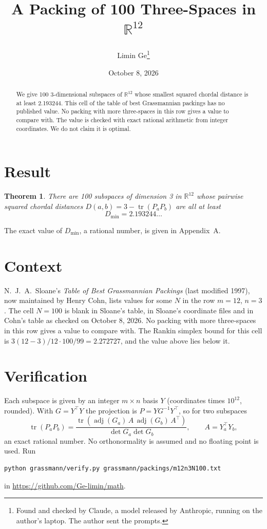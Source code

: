 \documentclass[11pt,a4paper]{article}
\title{A Packing of 100 Three-Spaces in $\mathbb{R}^{12}$}
\author{Limin Ge\thanks{Found and checked by Claude, a model released by Anthropic, running on the author's laptop. The author sent the prompts.}}
\date{October 8, 2026}
\newtheorem*{theorem}{Theorem}
\begin{document}
\maketitle
\begin{abstract}
We give 100 3-dimensional subspaces of $\mathbb{R}^{12}$ whose smallest squared chordal distance is at least 2.193244. This cell of the table of best Grassmannian packings has no published value. No packing with more three-spaces in this row gives a value to compare with. The value is checked with exact rational arithmetic from integer coordinates. We do not claim it is optimal.
\end{abstract}

\section{Result}
\begin{theorem}
There are 100 subspaces of dimension 3 in $\mathbb{R}^{12}$ whose pairwise squared chordal distances $D(a,b) = 3 - \operatorname{tr}(P_aP_b)$ are all at least
\[ D_{\min} = 2.193244\ldots \]
\end{theorem}
The exact value of $D_{\min}$, a rational number, is given in Appendix~A.


\section{Context}
N.~J.~A.~Sloane's \emph{Table of Best Grassmannian Packings} (last modified 1997), now maintained by Henry Cohn, lists values for some $N$ in the row $m=12$, $n=3$. The cell $N=100$ is blank in Sloane's table, in Sloane's coordinate files and in Cohn's table as checked on October 8, 2026. No packing with more three-spaces in this row gives a value to compare with. The Rankin simplex bound for this cell is $3(12-3)/12\cdot 100/99 = 2.272727$, and the value above lies below it.


\section{Verification}
Each subspace is given by an integer $m\times n$ basis $Y$ (coordinates times $10^{12}$, rounded). With $G=Y^\top Y$ the projection is $P=YG^{-1}Y^\top$, so for two subspaces
\[ \operatorname{tr}(P_aP_b)=\frac{\operatorname{tr}(\operatorname{adj}(G_a)\,A\,\operatorname{adj}(G_b)\,A^\top)}{\det G_a\det G_b},\qquad A=Y_a^\top Y_b, \]
an exact rational number. No orthonormality is assumed and no floating point is used. Run
\begin{verbatim}
python grassmann/verify.py grassmann/packings/m12n3N100.txt
\end{verbatim}
in \url{https://github.com/Ge-limin/math}.
\end{document}
